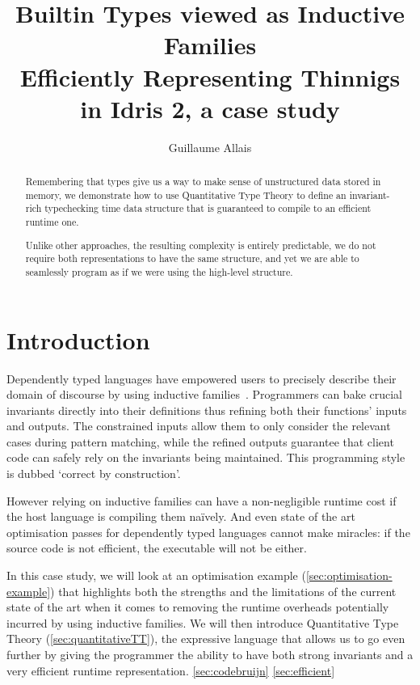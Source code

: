 \documentclass{article}
\newcommand{\idris}{Idris 2}
\begin{document}
\title{Builtin Types viewed as Inductive Families \\
{\large Efficiently Representing Thinnigs in \idris, a case study}}
\author{Guillaume Allais}

\maketitle

\begin{abstract}
  Remembering that types give us a way to make sense of unstructured data stored
  in memory, we demonstrate how to use Quantitative Type Theory to define an
  invariant-rich typechecking time data structure that is guaranteed to compile
  to an efficient runtime one.

  Unlike other approaches, the resulting complexity is entirely predictable, we do
  not require both representations to have the same structure, and yet we are able
  to seamlessly program as if we were using the high-level structure.
\end{abstract}

\section{Introduction}

Dependently typed languages have empowered users to precisely describe their domain
of discourse by using inductive families~\cite{DBLP:journals/fac/Dybjer94}.
%
Programmers can bake crucial invariants directly into their definitions thus refining
both their functions' inputs and outputs.
%
The constrained inputs allow them to only consider the relevant cases during pattern
matching, while the refined outputs guarantee that client code can safely rely on the
invariants being maintained.
%
This programming style is dubbed `correct by construction'.

However relying on inductive families can have a non-negligible runtime cost if
the host language is compiling them naïvely. And even state of the art optimisation
passes for dependently typed languages cannot make miracles: if the source code is
not efficient, the executable will not be either.

In this case study, we will look at an optimisation example
(\cref{sec:optimisation-example}) that highlights both
the strengths and the limitations of the current state of the art when it comes to
removing the runtime overheads potentially incurred by using inductive families.
%
We will then introduce Quantitative Type Theory (\cref{sec:quantitativeTT}), the
expressive language that allows us to go even further by giving the programmer
the ability to have both strong invariants and a very efficient runtime representation.
%
\cref{sec:codebruijn}
%
\cref{sec:efficient}
\end{document}
